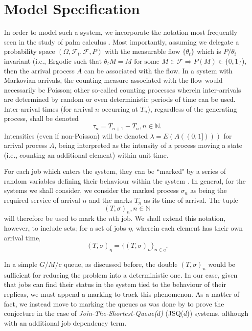 
\chapter{Model Specification}\label{ch:model-specification}

In order to model such a system, we incorporate the notation most frequently seen in the
study of palm calculus \cite{baccelli_elements_2003}. Most importantly, assuming we delegate a probability space $(\Omega, \mathcal{F}_{t}, \mathcal{F}, P)$ with the measurable flow $\{\theta_{t}\}$ which is $P/\theta_{t}$ invariant (i.e., Ergodic such that $\theta_{t}M = M \text{  for some } M \in \mathcal{F} \Rightarrow P(M) \in \{0,1\}$), then the arrival process $A$ can be associated with the flow.
In a system with Markovian arrivals, the counting measure associated with the flow would necessarily be Poisson;
other so-called counting processes wherein inter-arrivals are determined by random or even deterministic periods of time can be used. Inter-arrival times (for arrival $n$ occurring at $T_{n}$), regardless of the generating process, shall be denoted
\[\tau_{n} = T_{n+1}  - T_{n}, n \in \mathbb{N}.\]
Intensities (even if non-Poisson) will be denoted $\lambda = E(A((0,1])))$ for arrival process $A$, being interpreted as the intensity of a process moving a state (i.e., counting an additional element) within unit time.
\begin{definition}
    For each job which enters the system, they can be ``marked" by a series of random variables defining their behaviour within the system \cite{baccelli_elements_2003}. In general, for the systems we shall consider, we consider the marked process $\sigma_{n}$ as being the required service of arrival $n$ and the marks $T_{n}$ as its time of arrival.
    The tuple \[(T,\sigma)_{n}, n \in \mathbb{N}\] will therefore be used to mark the $n$th job.
    We shall extend this notation, however, to include sets;
    for a set of jobs $\eta$, wherein each element has their own arrival time,
    \[(T, \sigma)_{\eta} = \{(T,\sigma)_{n}\}_{n \in \eta}.\]
\end{definition}

In a simple $G/M/c$ queue, as discussed before, the double $(T,\sigma)_{n}$ would be sufficient for reducing the problem into a deterministic one.
In our case, given that jobs can find their status in the system tied to the behaviour of their replicas, we must append a marking to track this phenomenon.
As a matter of fact, we instead move to marking the queues as was done by \cite{bramson_asymptotic_2012} to prove the conjecture in the case of \textit{Join-The-Shortest-Queue($d$)} (JSQ($d$)) systems, although with an additional job dependency term.

